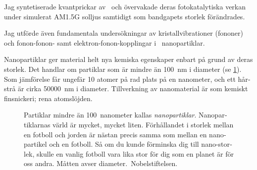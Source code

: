 \documentclass[webedition,openright,titles,swedish,english]{LuaUUThesis}\usepackage[]{graphicx}\usepackage[]{xcolor}
\begin{document}
\begin{otherlanguage}{swedish}
Jag syntetiserade kvantprickar av \ZnO\ och övervakade deras fotokatalytiska
verkan under simulerat AM1.5G solljus samtidigt som bandgapets storlek förändrades.

Jag utförde även fundamentala undersökningar av kristallvibrationer (fononer) och
fonon-fonon- samt elektron-fonon-kopplingar i \ZnO\ nanopartiklar.

Nanopartiklar ger material helt nya kemiska egenskaper enbart på grund av deras storlek.
Det handlar om partiklar som är mindre än \qty{100}{\nm} i diameter
(se \cref{fig:0900-nanopartikel-storlek}).
Som jämförelse får ungefär 10 atomer på rad plats på en nanometer, och ett hårstrå
är cirka \qty{50000}{\nm} i diameter.
Tillverkning av nanomaterial är som kemiskt finsnickeri; rena atomslöjden.

%

\begin{figure}[tbp]
\centering
\caption[Nanopartiklars storlek]{%
   Partiklar mindre än \qty{100}{nanometer} kallas \emph{nanopartiklar}.
   Nanopartiklarnas värld är mycket, mycket liten.
   Förhållandet i storlek mellan en fotboll och jorden är nästan precis samma
   som mellan en nanopartikel och en fotboll.
   Så om du kunde förminska dig till nano-storlek, skulle en vanlig fotboll
   vara lika stor för dig som en planet är för oss andra. Måtten avser diameter.
   {\footnotesize\CCBYND[\tiny]\,Nobelstiftelsen.}
}
\label{fig:0900-nanopartikel-storlek}
\end{figure}




\end{otherlanguage}
\end{document}
